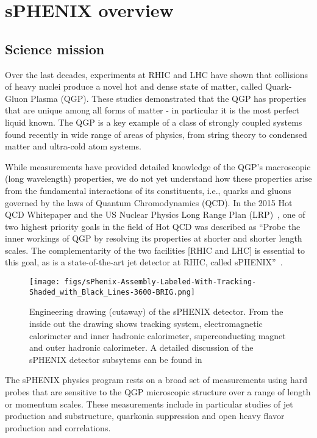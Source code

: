 \chapter{sPHENIX overview}
\label{chap:introduction}
\section{Science mission}
Over the last decades, experiments at RHIC and LHC have shown that collisions of heavy nuclei produce a novel hot and dense state of matter, called Quark-Gluon Plasma (QGP). These studies demonstrated that the QGP has properties that are unique among all forms of matter - in particular it is the most perfect liquid known. The QGP is a key example of a class of strongly coupled systems found recently in wide range of areas of physics, from string theory to condensed matter and ultra-cold atom systems.

While measurements have provided detailed knowledge of the QGP's macroscopic (long wavelength) properties, we do not yet understand how these properties arise from the fundamental interactions of its constituents, i.e., quarks and gluons governed by the laws of Quantum Chromodynamics (QCD).  In the 2015 Hot QCD Whitepaper and the US Nuclear Physics Long Range Plan (LRP)~\cite{Geesaman:2015fha}, one of two highest  priority goals in the field of Hot QCD was described as ``Probe the inner workings of QGP by resolving its properties at shorter and shorter length scales.
The complementarity of the two facilities [RHIC and LHC] is essential to this goal, as is a state-of-the-art jet detector at RHIC, called sPHENIX''~\cite{Geesaman:2015fha}.

\begin{figure}[htpb]
\begin{center}
\texttt{[image: figs/sPhenix-Assembly-Labeled-With-Tracking-Shaded\_with\_Black\_Lines-3600-BRIG.png]}
\end{center}
\vspace{-0.5cm}
\caption{\label{fig:sPHENIX}
Engineering drawing (cutaway) of the sPHENIX detector. From the inside out the drawing shows tracking system, electromagnetic calorimeter and inner hadronic calorimeter, superconducting magnet and outer hadronic calorimeter.
A detailed discussion of the sPHENIX detector
subsytems can be found in~\cite{sPHENIX:TDR}}
\end{figure}

The sPHENIX physics program rests on a broad set of measurements using hard probes that are sensitive to the QGP microscopic structure over a range of length or momentum scales. These measurements include in particular studies of jet production and substructure, quarkonia suppression and open heavy flavor production and correlations.  

